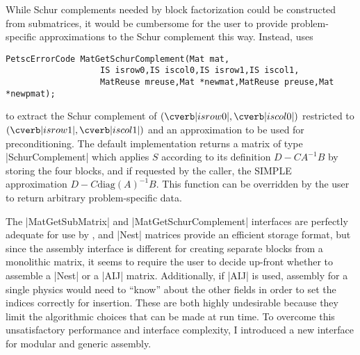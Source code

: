 While Schur complements needed by block factorization could be constructed from submatrices, it would be cumbersome for the user to provide problem-specific approximations to the Schur complement this way.
Instead,  uses
\begin{verbatim}
PetscErrorCode MatGetSchurComplement(Mat mat,
                   IS isrow0,IS iscol0,IS isrow1,IS iscol1,
                   MatReuse mreuse,Mat *newmat,MatReuse preuse,Mat *newpmat);
\end{verbatim}
to extract the Schur complement of $(\cverb|isrow0|,\cverb|iscol0|)$ restricted to $(\cverb|isrow1|,\cverb|iscol1|)$ and an approximation to be used for preconditioning.
The default implementation returns a matrix of type \cverb|SchurComplement| which applies $S$ according to its definition $D - CA^{-1}B$ by storing the four blocks, and if requested by the caller, the SIMPLE~\citep{patankar1972cph} approximation $D - C\text{diag}(A)^{-1}B$.
This function can be overridden by the user to return arbitrary problem-specific data.

The \cfunc|MatGetSubMatrix| and \cfunc|MatGetSchurComplement| interfaces are perfectly adequate for use by , and \cverb|Nest| matrices provide an efficient storage format, but since the assembly interface is different for creating separate blocks from a monolithic matrix, it seems to require the user to decide up-front whether to assemble a \cverb|Nest| or a \cverb|AIJ| matrix.
Additionally, if \cverb|AIJ| is used, assembly for a single physics would need to ``know'' about the other fields in order to set the indices correctly for insertion.
These are both highly undesirable because they limit the algorithmic choices that can be made at run time.
To overcome this unsatisfactory performance and interface complexity, I introduced a new interface for modular and generic assembly.

